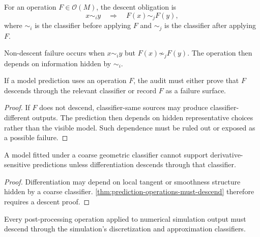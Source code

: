 \begin{definition}
\label{def:descent-obligation-audit}
For an operation $F\in\mathcal O(M)$, the descent obligation is
$$
x\sim_i y
\quad\Longrightarrow\quad
F(x)\sim_j F(y),
$$
where $\sim_i$ is the classifier before applying $F$ and $\sim_j$ is the classifier after applying $F$.
\end{definition}

\begin{definition}
\label{def:non-descent-failure-audit}
Non-descent failure occurs when $x\sim_i y$ but $F(x)\not\sim_j F(y)$. The operation then depends on information hidden by $\sim_i$.
\end{definition}

\begin{theorem}
\label{thm:prediction-operations-must-descend}
If a model prediction uses an operation $F$, the audit must either prove that $F$ descends through the relevant classifier or record $F$ as a failure surface.
\end{theorem}

\begin{proof}
If $F$ does not descend, classifier-same sources may produce classifier-different outputs. The prediction then depends on hidden representative choices rather than the visible model. Such dependence must be ruled out or exposed as a possible failure.
\end{proof}

\begin{corollary}
\label{cor:differentiation-audit-sensitive}
A model fitted under a coarse geometric classifier cannot support derivative-sensitive predictions unless differentiation descends through that classifier.
\end{corollary}

\begin{proof}
Differentiation may depend on local tangent or smoothness structure hidden by a coarse classifier. \autoref{thm:prediction-operations-must-descend} therefore requires a descent proof.
\end{proof}

\begin{corollary}
\label{cor:simulation-post-processing-descent}
Every post-processing operation applied to numerical simulation output must descend through the simulation's discretization and approximation classifiers.
\end{corollary}

